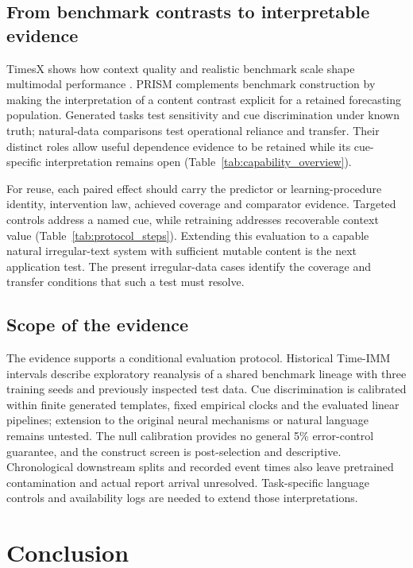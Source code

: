 \documentclass[preprint,11pt]{elsarticle}
\newcommand{\prism}{\textsc{PRISM}}
\begin{document}


\subsection{From benchmark contrasts to interpretable evidence}

TimesX shows how context quality and realistic benchmark scale shape multimodal performance \cite{liu2026timesx}. \prism{} complements benchmark construction by making the interpretation of a content contrast explicit for a retained forecasting population. Generated tasks test sensitivity and cue discrimination under known truth; natural-data comparisons test operational reliance and transfer. Their distinct roles allow useful dependence evidence to be retained while its cue-specific interpretation remains open (Table~\ref{tab:capability_overview}).

For reuse, each paired effect should carry the predictor or learning-procedure identity, intervention law, achieved coverage and comparator evidence. Targeted controls address a named cue, while retraining addresses recoverable context value (Table~\ref{tab:protocol_steps}). Extending this evaluation to a capable natural irregular-text system with sufficient mutable content is the next application test. The present irregular-data cases identify the coverage and transfer conditions that such a test must resolve.

\subsection{Scope of the evidence}

The evidence supports a conditional evaluation protocol. Historical Time-IMM intervals describe exploratory reanalysis of a shared benchmark lineage with three training seeds and previously inspected test data. Cue discrimination is calibrated within finite generated templates, fixed empirical clocks and the evaluated linear pipelines; extension to the original neural mechanisms or natural language remains untested. The null calibration provides no general 5\% error-control guarantee, and the construct screen is post-selection and descriptive. Chronological downstream splits and recorded event times also leave pretrained contamination and actual report arrival unresolved. Task-specific language controls and availability logs are needed to extend those interpretations.

\section{Conclusion}
\end{document}
